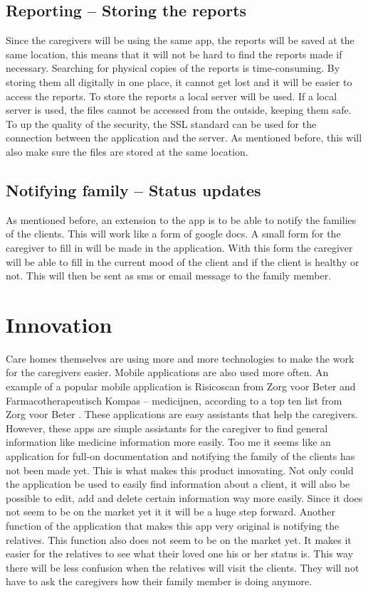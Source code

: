 \documentclass[12pt, a4paper]{article}
\begin{document}
\subsection{Reporting – Storing the reports}
Since the caregivers will be using the same app, the reports will be saved at the same location, this means that it will not be hard to find the reports made if necessary. Searching for physical copies of the reports is time-consuming. By storing them all digitally in one place, it cannot get lost and it will be easier to access the reports. 
To store the reports a local server will be used. If a local server is used, the files cannot be accessed from the outside, keeping them safe. To up the quality of the security, the SSL standard can be used for the connection between the application and the server. As mentioned before, this will also make sure the files are stored at the same location.

\subsection{Notifying family – Status updates}
As mentioned before, an extension to the app is to be able to notify the families of the clients. This will work like a form of google docs. A small form for the caregiver to fill in will be made in the application. With this form the caregiver will be able to fill in the current mood of the client and if the client is healthy or not. This will then be sent as sms or email message to the family member.

\newpage

\section{Innovation}
Care homes themselves are using more and more technologies to make the work for the caregivers easier. Mobile applications are also used more often. An example of a popular mobile application is Risicoscan from Zorg voor Beter and Farmacotherapeutisch Kompas – medicijnen, according to a top ten list from Zorg voor Beter \cite{herlihy:methodology}. These applications are easy assistants that help the caregivers. However, these apps are simple assistants for the caregiver to find general information like medicine information more easily. Too me it seems like an application for full-on documentation and notifying the family of the clients has not been made yet. This is what makes this product innovating. Not only could the application be used to easily find information about a client, it will also be possible to edit, add and delete certain information way more easily. Since it does not seem to be on the market yet it it will be a huge step forward. 
Another function of the application that makes this app very original is notifying the relatives. This function also does not seem to be on the market yet. It makes it easier for the relatives to see what their loved one his or her status is. This way there will be less confusion when the relatives will visit the clients. They will not have to ask the caregivers how their family member is doing anymore.
\end{document}
